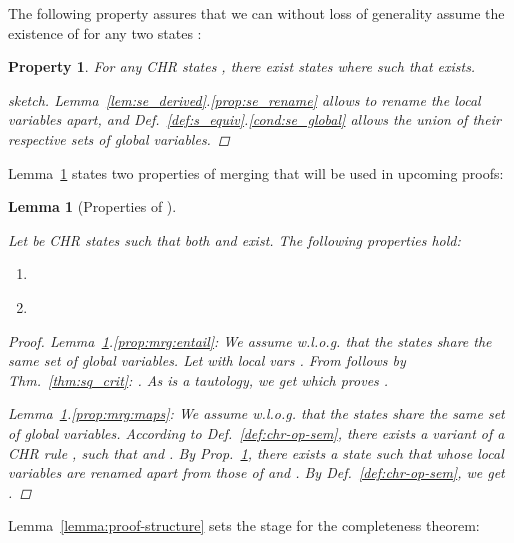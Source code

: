 \documentclass[acmtocl]{acmtrans2m}
\newtheorem{lemma}[theorem]{Lemma}
\newtheorem{property}[theorem]{Property}
\begin{document}
The following property assures that we can without loss of generality assume
the existence of  for any two states :

\begin{property}\label{prop:generalityofmerging}
For any CHR states , there exist states  where  such that  exists.
\begin{proof}[sketch]
Lemma~\ref{lem:se_derived}.\ref{prop:se_rename} allows to rename the local
variables apart, and Def.~\ref{def:s_equiv}.\ref{cond:se_global} allows the
union of their respective sets of global variables.
\end{proof}
\end{property}

Lemma~\ref{lemma:merging_derived} states two properties of merging that will be
used in upcoming proofs:

\begin{lemma}[Properties of ]
	\label{lemma:merging_derived}

Let  be CHR states such that both  and 
exist. The following properties hold:

\begin{enumerate}
  \item \label{prop:mrg:entail}
  
  \item \label{prop:mrg:maps}
  
\end{enumerate}

\begin{proof}
Lemma~\ref{lemma:merging_derived}.\ref{prop:mrg:entail}: We assume w.l.o.g. that
the states  share the same set of global variables. Let
 with local vars
.
From  follows by Thm.~\ref{thm:sq_crit}:
.
As  is a tautology, we get 
which proves .

Lemma~\ref{lemma:merging_derived}.\ref{prop:mrg:maps}: We assume w.l.o.g. that
the states  share the same set of global variables. According to
Def.~\ref{def:chr-op-sem}, there exists a variant of a CHR rule , such that  and . By Prop.~\ref{prop:generalityofmerging}, there
exists a state  such that  whose local
variables are renamed apart from those of  and . By
Def.~\ref{def:chr-op-sem}, we get .
\end{proof}
\end{lemma}

Lemma~\ref{lemma:proof-structure} sets the stage for the completeness theorem:
\end{document}
